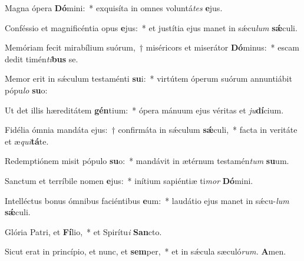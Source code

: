 \item Magna ópera \textbf{Dó}mini:~* exquisíta in omnes voluntá\tinyhspace\textit{tes} \textbf{e}jus.
\item Conféssio et magnificéntia opus \textbf{e}jus:~* et justítia ejus manet in sǽcu\tinyhspace\textit{lum} \textbf{sǽ}culi.
\item Memóriam fecit mirabílium suórum,~† miséricors et miserátor \textbf{Dó}minus:~* escam dedit timén\textit{ti}\textbf{bus} se.
\item Memor erit in sǽculum testaménti \textbf{su}i:~* virtútem óperum suórum annuntiábit pópu\tinyhspace\textit{lo} \textbf{su}o:
\item Ut det illis hæreditátem \textbf{gén}tium:~* ópera mánuum ejus véritas et \textit{ju}\textbf{dí}cium.
\item Fidélia ómnia mandáta ejus:~† confirmáta in sǽculum \textbf{sǽ}culi,~* facta in veritáte et æ\tinyhspace\textit{qui}\textbf{tá}te.
\item Redemptiónem misit pópulo \textbf{su}o:~* mandávit in ætérnum testamén\tinyhspace\textit{tum} \textbf{su}um.
\item Sanctum et terríbile nomen \textbf{e}jus:~* inítium sapiéntiæ ti\textit{mor} \textbf{Dó}mini.
\item Intelléctus bonus ómnibus faciéntibus \textbf{e}um:~* laudátio ejus manet in sǽcu-\tinyhspace\textit{lum} \textbf{sǽ}culi.
\item Glória Patri, et \textbf{Fí}lio,~* et Spirítu\textit{i} \textbf{San}cto.
\item Sicut erat in princípio, et nunc, et \textbf{sem}per,~* et in sǽcula sæculó\textit{rum.} \textbf{A}men.


